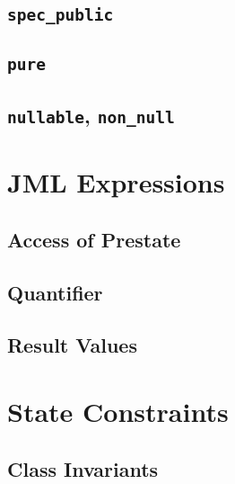 \documentclass[a4paper, 11pt, accentcolor = tud3b]{tudreport}
\begin{document}
            \subsection{\texttt{spec_public}} %

            \subsection{\texttt{pure}} %

            \subsection{\texttt{nullable}, \texttt{non_null}} %

        \section{JML Expressions} %

            \subsection{Access of Prestate} %

            \subsection{Quantifier} %

            \subsection{Result Values} %

        \section{State Constraints} %

            \subsection{Class Invariants} %
\end{document}
